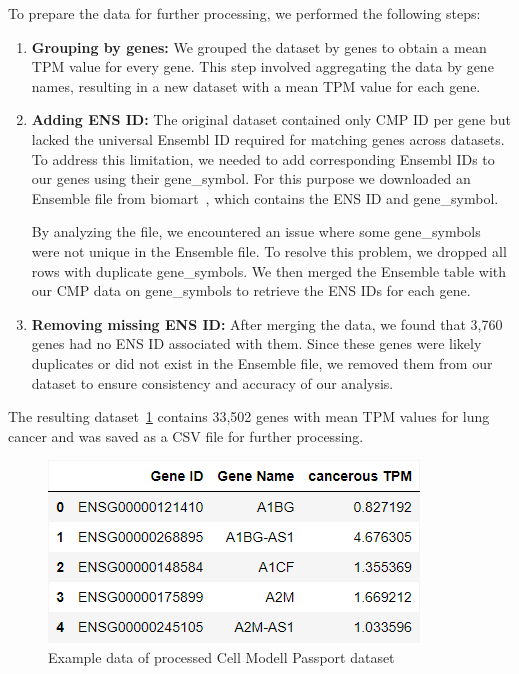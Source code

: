 To prepare the data for further processing, we performed the following steps:
\begin{enumerate}
    \item \textbf{Grouping by genes:} We grouped the dataset by genes to obtain a mean TPM value for every gene.
    This step involved aggregating the data by gene names, resulting in a new dataset with a mean TPM value for each gene.
    \item \textbf{Adding ENS ID:}
    The original dataset contained only CMP ID per gene but lacked the universal Ensembl ID required for matching genes across datasets.
    To address this limitation, we needed to add corresponding Ensembl IDs to our genes using their gene\_symbol.
    For this purpose we downloaded an Ensemble file from biomart~\cite{bio_marts},
    which contains the ENS ID and gene\_symbol.

    By analyzing the file, we encountered an issue where some gene\_symbols were not unique in the Ensemble file.
    To resolve this problem, we dropped all rows with duplicate gene\_symbols. %
    We then merged the Ensemble table with our CMP data on gene\_symbols to retrieve the ENS IDs for each gene.

    \item \textbf{Removing missing ENS ID:} After merging the data, we found that 3,760 genes had no ENS ID associated with them.
    Since these genes were likely duplicates or did not exist in the Ensemble file,
    we removed them from our dataset to ensure consistency and accuracy of our analysis.
\end{enumerate}
The resulting dataset~\ref{fig:03_01_df_CMP_cancer_mean} contains 33,502 genes with mean TPM values for lung cancer and was saved as a CSV file for further processing.



\begin{figure}[h]
    \centering
    \includegraphics[height=\dfheight]{figures/03_01_CMP_cancer_mean}
    \caption{Example data of processed Cell Modell Passport dataset}
    \label{fig:03_01_df_CMP_cancer_mean}
\end{figure}

